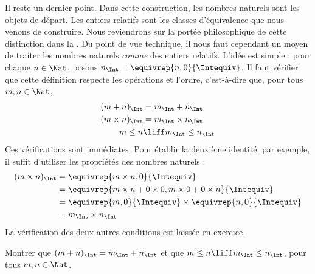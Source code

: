 \documentclass[../../../include/open-logic-section]{subfiles}
\begin{document}
Il reste un dernier point. Dans cette construction, les nombres
naturels sont les objets de départ. Les entiers relatifs sont les
classes d’équivalence que nous venons de construire.
Nous reviendrons sur la portée philosophique de cette distinction dans la
. Du point de vue technique, il nous faut cependant un moyen
de traiter les nombres naturels \emph{comme} des entiers relatifs. L'idée
est simple : pour chaque $n \in \Nat$, posons
$n_\Int = \equivrep{n, 0}{\Intequiv}$. Il faut vérifier que cette définition
respecte les opérations et l'ordre, c'est-à-dire que, pour tous $m, n \in \Nat$,
\begin{align*}
	(m + n)_\Int &= m_\Int + n_\Int\\
	(m \times n)_\Int &= m_\Int \times n_\Int\\
	m \leq n &\liff m_\Int \leq n_\Int
\end{align*}
Ces vérifications sont immédiates. Pour établir la deuxième identité,
par exemple, il suffit d'utiliser les propriétés des nombres naturels :
	\begin{align*}
		(m \times n)_\Int  &= \equivrep{m \times n, 0}{\Intequiv} \\
		&= \equivrep{m \times n + 0 \times 0, m \times 0 + 0 \times n}{\Intequiv} \\
		&= \equivrep{m, 0}{\Intequiv} \times \equivrep{n, 0}{\Intequiv} \\
		&= m_\Int \times n_\Int
	\end{align*}
La vérification des deux autres conditions est laissée en exercice.
\begin{prob}
	Montrer que $(m + n)_\Int = m_\Int + n_\Int$ et que $m \leq n \liff m_\Int \leq n_\Int$, pour tous $m, n \in \Nat$.
\end{prob}
\end{document}
